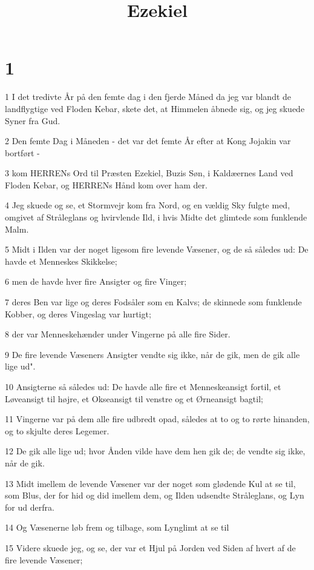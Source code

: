 

\title{Ezekiel}


\chapter{1}

\par 1 I det tredivte År på den femte dag i den fjerde Måned da jeg var blandt de landflygtige ved Floden Kebar, skete det, at Himmelen åbnede sig, og jeg skuede Syner fra Gud.
\par 2 Den femte Dag i Måneden - det var det femte År efter at Kong Jojakin var bortført -
\par 3 kom HERRENs Ord til Præsten Ezekiel, Buzis Søn, i Kaldæernes Land ved Floden Kebar, og HERRENs Hånd kom over ham der.
\par 4 Jeg skuede og se, et Stormvejr kom fra Nord, og en vældig Sky fulgte med, omgivet af Stråleglans og hvirvlende Ild, i hvis Midte det glimtede som funklende Malm.
\par 5 Midt i Ilden var der noget ligesom fire levende Væsener, og de så således ud: De havde et Menneskes Skikkelse;
\par 6 men de havde hver fire Ansigter og fire Vinger;
\par 7 deres Ben var lige og deres Fodsåler som en Kalvs; de skinnede som funklende Kobber, og deres Vingeslag var hurtigt;
\par 8 der var Menneskehænder under Vingerne på alle fire Sider.
\par 9 De fire levende Væseners Ansigter vendte sig ikke, når de gik, men de gik alle lige ud".
\par 10 Ansigterne så således ud: De havde alle fire et Menneskeansigt fortil, et Løveansigt til højre, et Okseansigt til venstre og et Ørneansigt bagtil;
\par 11 Vingerne var på dem alle fire udbredt opad, således at to og to rørte hinanden, og to skjulte deres Legemer.
\par 12 De gik alle lige ud; hvor Ånden vilde have dem hen gik de; de vendte sig ikke, når de gik.
\par 13 Midt imellem de levende Væsener var der noget som glødende Kul at se til, som Blus, der for hid og did imellem dem, og Ilden udsendte Stråleglans, og Lyn for ud derfra.
\par 14 Og Væsenerne løb frem og tilbage, som Lynglimt at se til
\par 15 Videre skuede jeg, og se, der var et Hjul på Jorden ved Siden af hvert af de fire levende Væsener;
